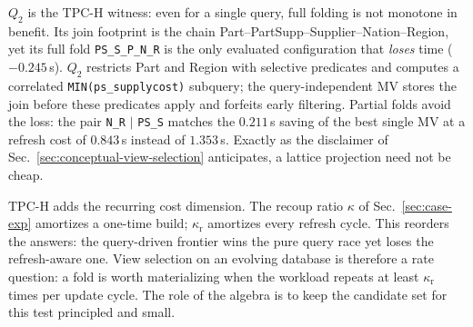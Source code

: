 \documentclass[sigconf]{acmart}
\begin{document}
$Q_2$ is the TPC-H witness: even for a single query, full folding is not monotone in benefit. Its join footprint is the chain \textsf{Part}--\textsf{PartSupp}--\textsf{Supplier}--\textsf{Nation}--\textsf{Region}, yet its full fold \texttt{PS\_S\_P\_N\_R} is the only evaluated configuration that \emph{loses} time ($-0.245$\,s). $Q_2$ restricts \textsf{Part} and \textsf{Region} with selective predicates and computes a correlated \texttt{MIN(ps\_supplycost)} subquery; the query-independent MV stores the join before these predicates apply and forfeits early filtering. Partial folds avoid the loss: the pair \texttt{N\_R} $\mid$ \texttt{PS\_S} matches the $0.211$\,s saving of the best single MV at a refresh cost of $0.843$\,s instead of $1.353$\,s. Exactly as the disclaimer of Sec.~\ref{sec:conceptual-view-selection} anticipates, a lattice projection need not be cheap.

TPC-H adds the recurring cost dimension. The recoup ratio $\kappa$ of Sec.~\ref{sec:case-exp} amortizes a one-time build; $\kappa_{\mathrm r}$ amortizes every refresh cycle. This reorders the answers: the query-driven frontier wins the pure query race yet loses the refresh-aware one. View selection on an evolving database is therefore a rate question: a fold is worth materializing when the workload repeats at least $\kappa_{\mathrm r}$ times per update cycle. The role of the algebra is to keep the candidate set for this test principled and small.


\end{document}
